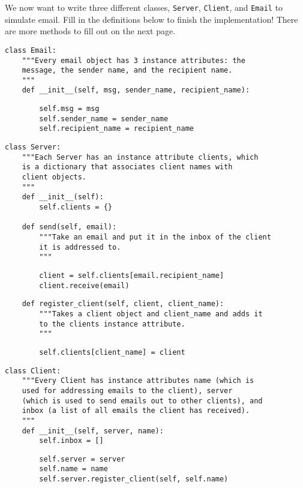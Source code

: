 \question

We now want to write three different classes, \texttt{Server}, \texttt{Client},
and \texttt{Email} to simulate email. Fill in the definitions below to finish
the implementation! There are more methods to fill out on the next page.

\begin{lstlisting}
class Email:
    """Every email object has 3 instance attributes: the
    message, the sender name, and the recipient name.
    """
    def __init__(self, msg, sender_name, recipient_name):
\end{lstlisting}
\begin{solution}[1in]
\begin{lstlisting}
        self.msg = msg
        self.sender_name = sender_name
        self.recipient_name = recipient_name
\end{lstlisting}
\end{solution}

\begin{lstlisting}
class Server:
    """Each Server has an instance attribute clients, which
    is a dictionary that associates client names with
    client objects.
    """
    def __init__(self):
        self.clients = {}

    def send(self, email):
        """Take an email and put it in the inbox of the client
        it is addressed to.
        """
\end{lstlisting}
\begin{solution}[1in]
\begin{lstlisting}
        client = self.clients[email.recipient_name]
        client.receive(email)
\end{lstlisting}
\end{solution}

\begin{lstlisting}
    def register_client(self, client, client_name):
        """Takes a client object and client_name and adds it
        to the clients instance attribute.
        """
\end{lstlisting}
\begin{solution}[1in]
\begin{lstlisting}
        self.clients[client_name] = client
\end{lstlisting}
\end{solution}

\pagebreak

\begin{lstlisting}
class Client:
    """Every Client has instance attributes name (which is
    used for addressing emails to the client), server
    (which is used to send emails out to other clients), and
    inbox (a list of all emails the client has received).
    """
    def __init__(self, server, name):
        self.inbox = []
\end{lstlisting}
\begin{solution}[1in]
\begin{lstlisting}
        self.server = server
        self.name = name
        self.server.register_client(self, self.name)
\end{lstlisting}
\end{solution}

